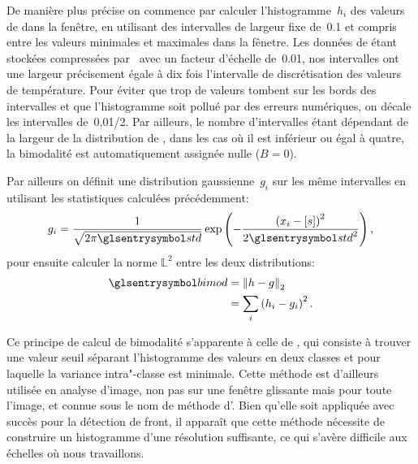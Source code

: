 De manière plus précise on commence par calculer l'histogramme~\(h_i\) des valeurs de  dans la fenêtre, en utilisant des intervalles de largeur fixe de~\qty{0.1}{\dC} et compris entre les valeurs minimales et maximales dans la fênetre.
Les données de  étant stockées compressées par \footnotemark\ avec un facteur d'échelle de~\qty{0.01}{\dC}, nos intervalles ont une largeur précisement égale à dix fois l'intervalle de discrétisation des valeurs de température.
Pour éviter que trop de valeurs tombent sur les bords des intervalles et que l'histogramme soit pollué par des erreurs numériques, on décale les intervalles de~\qty[parse-numbers=false]{0,01/2}{\dC}.
Par ailleurs, le nombre d'intervalles étant dépendant de la largeur de la distribution de , dans les cas où il est inférieur ou égal à quatre, la bimodalité est automatiquement assignée nulle (\(B=0\)).

Par ailleurs on définit une distribution gaussienne~\(g_i\) sur les même intervalles en utilisant les statistiques calculées précédemment:
\begin{equation}
  g_i = \frac{1}{\sqrt{2\pi\am{std}}} \exp\paren{-\frac{\paren{x_i-\moy{s}}^2}{2\am{std}^2}},
\end{equation}
pour ensuite calculer la norme \(\mathbb{L}^2\) entre les deux distributions:
\begin{equation}
  \begin{split}
  \am{bimod} & = \norme[2]{h - g}\\
             & = \sum_i \paren{h_i - g_i}^2 .
  \end{split}
\end{equation}

Ce principe de calcul de bimodalité s'apparente à celle de \textcite{cayula_1992}, qui consiste à trouver une valeur seuil séparant l'histogramme des valeurs en deux classes et pour laquelle la variance intra"-classe est minimale.
Cette méthode est d'ailleurs utilisée en analyse d'image, non pas sur une fenêtre glissante mais pour toute l'image, et connue sous le nom de méthode d'\textcite{otsu_1979}.
Bien qu'elle soit appliquée avec succès pour la détection de front, il apparaît que cette méthode nécessite de construire un histogramme d'une résolution suffisante, ce qui s'avère difficile aux échelles où nous travaillons.

